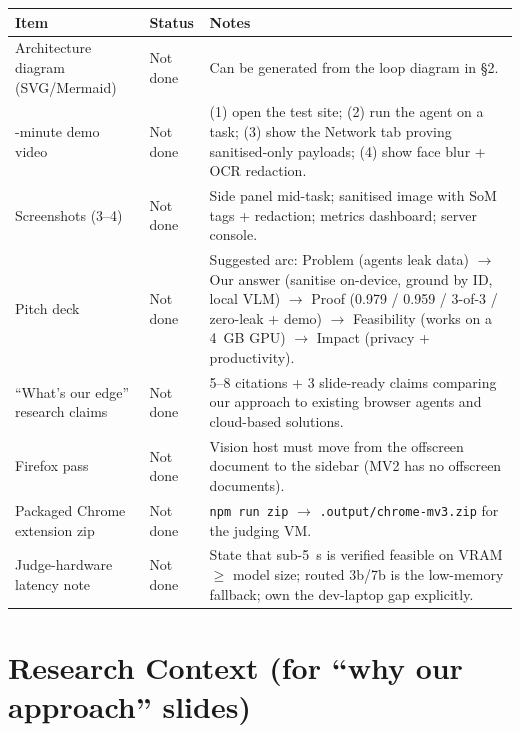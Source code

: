 \documentclass[11pt,a4paper]{article}
\newcommand{\code}[1]{\texttt{#1}}
\begin{document}
\begin{table}[H]
\centering
\small
\begin{tabularx}{\textwidth}{@{}>{\raggedright\arraybackslash}p{4.6cm} p{1.7cm} X@{}}
\toprule
\textbf{Item} & \textbf{Status} & \textbf{Notes}\\
\midrule
Architecture diagram (SVG/Mermaid) & Not done & Can be generated from the loop diagram in \S2.\\
3-minute demo video & Not done & (1) open the test site; (2) run the agent on a task; (3) show the Network tab proving sanitised-only payloads; (4) show face blur + OCR redaction.\\
Screenshots (3--4) & Not done & Side panel mid-task; sanitised image with SoM tags + redaction; metrics dashboard; server console.\\
Pitch deck & Not done & Suggested arc: Problem (agents leak data) $\rightarrow$ Our answer (sanitise on-device, ground by ID, local VLM) $\rightarrow$ Proof (0.979 / 0.959 / 3-of-3 / zero-leak + demo) $\rightarrow$ Feasibility (works on a 4~GB GPU) $\rightarrow$ Impact (privacy + productivity).\\
``What's our edge'' research claims & Not done & 5--8 citations + 3 slide-ready claims comparing our approach to existing browser agents and cloud-based solutions.\\
Firefox pass & Not done & Vision host must move from the offscreen document to the sidebar (MV2 has no offscreen documents).\\
Packaged Chrome extension zip & Not done & \code{npm run zip} $\rightarrow$ \code{.output/chrome-mv3.zip} for the judging VM.\\
Judge-hardware latency note & Not done & State that sub-5~s is verified feasible on VRAM $\geq$ model size; routed 3b/7b is the low-memory fallback; own the dev-laptop gap explicitly.\\
\bottomrule
\end{tabularx}
\end{table}

\section{Research Context (for ``why our approach'' slides)}
\end{document}
